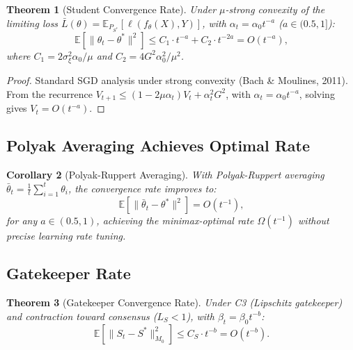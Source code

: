 \documentclass[11pt,a4paper]{article}
\theoremstyle{plain}
\newtheorem{theorem}{Theorem}[section]
\newtheorem{corollary}[theorem]{Corollary}
\theoremstyle{definition}
\theoremstyle{remark}
\newcommand{\E}{\mathbb{E}}
\begin{document}
\begin{theorem}[Student Convergence Rate]\label{thm:rate-student}
    Under $\mu$-strong convexity of the limiting loss $\bar{L}(\theta) = \E_{P_{S^*}}[\ell(f_\theta(X), Y)]$, with $\alpha_t = \alpha_0 t^{-a}$ ($a \in (0.5, 1]$):
    \begin{equation}
        \E[\|\theta_t - \theta^*\|^2] \leq C_1 \cdot t^{-a} + C_2 \cdot t^{-2a} = O(t^{-a}),
    \end{equation}
    where $C_1 = 2\sigma_\xi^2 \alpha_0 / \mu$ and $C_2 = 4 G^2 \alpha_0^2 / \mu^2$.
\end{theorem}

\begin{proof}
    Standard SGD analysis under strong convexity (Bach \& Moulines, 2011). From the recurrence $V_{t+1} \leq (1 - 2\mu\alpha_t) V_t + \alpha_t^2 G^2$, with $\alpha_t = \alpha_0 t^{-a}$, solving gives $V_t = O(t^{-a})$.
\end{proof}

\subsection{Polyak Averaging Achieves Optimal Rate}

\begin{corollary}[Polyak-Ruppert Averaging]\label{cor:polyak}
    With Polyak-Ruppert averaging $\bar{\theta}_t = \frac{1}{t}\sum_{i=1}^t \theta_i$, the convergence rate improves to:
    \begin{equation}
        \E[\|\bar{\theta}_t - \theta^*\|^2] = O(t^{-1}),
    \end{equation}
    for \emph{any} $a \in (0.5, 1)$, achieving the minimax-optimal rate $\Omega(t^{-1})$ without precise learning rate tuning.
\end{corollary}

\subsection{Gatekeeper Rate}

\begin{theorem}[Gatekeeper Convergence Rate]\label{thm:rate-gatekeeper}
    Under C3 (Lipschitz gatekeeper) and contraction toward consensus ($L_S < 1$), with $\beta_t = \beta_0 t^{-b}$:
    \begin{equation}
        \E[\|S_t - S^*\|_{M_0}^2] \leq C_S \cdot t^{-b} = O(t^{-b}).
    \end{equation}
\end{theorem}
\end{document}
